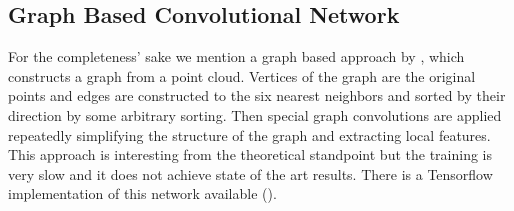 \subsection{Graph Based Convolutional Network}
For the completeness’ sake we mention a graph based approach by \cite{dominguez_general-purpose_2018}, which constructs a graph from a point cloud. Vertices of the graph are the original points and edges are constructed to the six nearest neighbors and sorted by their direction by some arbitrary sorting. Then special graph convolutions are applied repeatedly simplifying the structure of the graph and extracting local features. This approach is interesting from the theoretical standpoint but the training is very slow and it does not achieve state of the art results. There is a Tensorflow implementation of this network available (\cite{dominguez_g3dnet_2018}).



